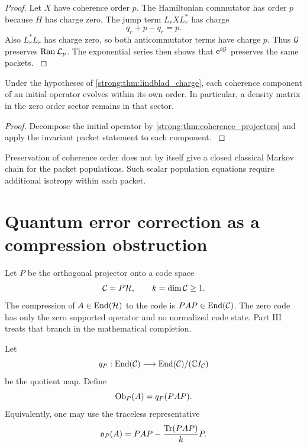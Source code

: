 \begin{proof}\label{strong:proof:037}
Let \(X\) have coherence order \(p\). The Hamiltonian commutator has order \(p\) because \(H\) has charge zero. The jump term \(L_rXL_r^*\) has charge
\[
q_r+p-q_r=p.
\]
Also \(L_r^*L_r\) has charge zero, so both anticommutator terms have charge \(p\). Thus \(\Gcal\) preserves \(\Ran\Lcal_p\). The exponential series then shows that \(\e^{t\Gcal}\) preserves the same packets.
\label{strong:proof:037:end}\end{proof}

\begin{corollary}\label{strong:corollary:010}\label{strong:cor:no_coherence_mixing}
Under the hypotheses of \cref{strong:thm:lindblad_charge}, each coherence component of an initial operator evolves within its own order. In particular, a density matrix in the zero order sector remains in that sector.
\end{corollary}

\begin{proof}\label{strong:proof:038}
Decompose the initial operator by \cref{strong:thm:coherence_projectors} and apply the invariant packet statement to each component.
\label{strong:proof:038:end}\end{proof}

Preservation of coherence order does not by itself give a closed classical Markov chain for the packet populations. Such scalar population equations require additional isotropy within each packet.

\section{Quantum error correction as a compression obstruction}\label{strong:section:008}\label{strong:sec:qec}

Let \(P\) be the orthogonal projector onto a code space
\[
\Ccal=P\Hcal,
\qquad
k=\dim\Ccal\ge1.
\]
The compression of \(A\in\End(\Hcal)\) to the code is \(PAP\in\End(\Ccal)\). The zero code has only the zero supported operator and no normalized code state. Part III treats that branch in the mathematical completion.

\begin{definition}\label{strong:definition:005}\label{strong:def:code_obstruction}
Let
\[
q_P:\End(\Ccal)\longrightarrow\End(\Ccal)/(\CC I_{\Ccal})
\]
be the quotient map. Define
\[
\operatorname{Ob}_P(A)=q_P(PAP).
\]
Equivalently, one may use the traceless representative
\[
\ob_P(A)
=
PAP-
\frac{\Tr(PAP)}{k}P.
\]
\end{definition}

